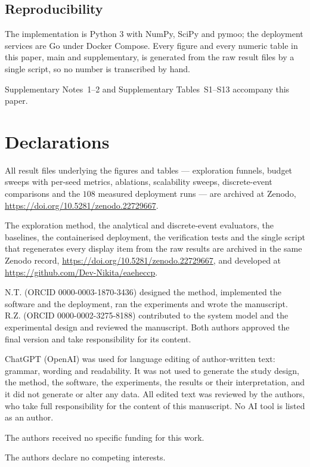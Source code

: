 \documentclass[pdflatex,sn-nature,lineno]{sn-jnl}
\begin{document}
\subsection{Reproducibility}
The implementation is Python 3 with NumPy, SciPy and pymoo; the deployment services are
Go under Docker Compose. Every figure and every numeric table in this paper, main and
supplementary, is generated from the raw result files by a single script, so no number is
transcribed by hand.

\backmatter

Supplementary Notes~1--2 and Supplementary Tables~S1--S13 accompany this paper.

\section*{Declarations}

All result files underlying the figures and tables --- exploration funnels, budget sweeps
with per-seed metrics, ablations, scalability sweeps, discrete-event comparisons and the
$108$ measured deployment runs --- are archived at Zenodo,
\url{https://doi.org/10.5281/zenodo.22729667}.

The exploration method, the analytical and discrete-event evaluators, the baselines, the
containerised deployment, the verification tests and the single script that regenerates
every display item from the raw results are archived in the same Zenodo record,
\url{https://doi.org/10.5281/zenodo.22729667}, and developed at
\url{https://github.com/Dev-Nikita/eaeheccp}.

N.T. (ORCID 0000-0003-1870-3436) designed the method, implemented the software and the
deployment, ran the experiments and wrote the manuscript. R.Z. (ORCID
0000-0002-3275-8188) contributed to the system model and the experimental design and
reviewed the manuscript. Both authors approved the final version and take responsibility
for its content.

ChatGPT (OpenAI) was used for language editing of author-written text: grammar, wording
and readability. It was not used to generate the study design, the method, the software,
the experiments, the results or their interpretation, and it did not generate or alter any
data. All edited text was reviewed by the authors, who take full responsibility for the
content of this manuscript. No AI tool is listed as an author.

The authors received no specific funding for this work.

The authors declare no competing interests.


\end{document}
